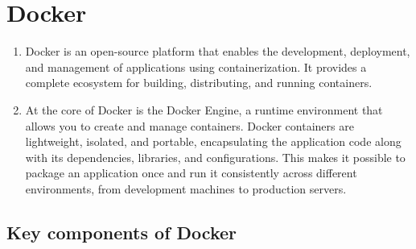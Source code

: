 \newpage

\section*{Docker}

\begin{enumerate}
    \item Docker is an open-source platform that enables the development, deployment, and management of applications using containerization. It provides a complete ecosystem for building, distributing, and running containers.

    \item At the core of Docker is the Docker Engine, a runtime environment that allows you to create and manage containers. Docker containers are lightweight, isolated, and portable, encapsulating the application code along with its dependencies, libraries, and configurations. This makes it possible to package an application once and run it consistently across different environments, from development machines to production servers.

\end{enumerate}

\subsection*{Key components of Docker}

